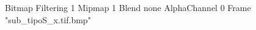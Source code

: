 {Bitmap
	{Filtering 1}
	{Mipmap 1}
	{Blend none}
	{AlphaChannel 0}
	{Frame "sub_tipoS_x.tif.bmp"}
}
